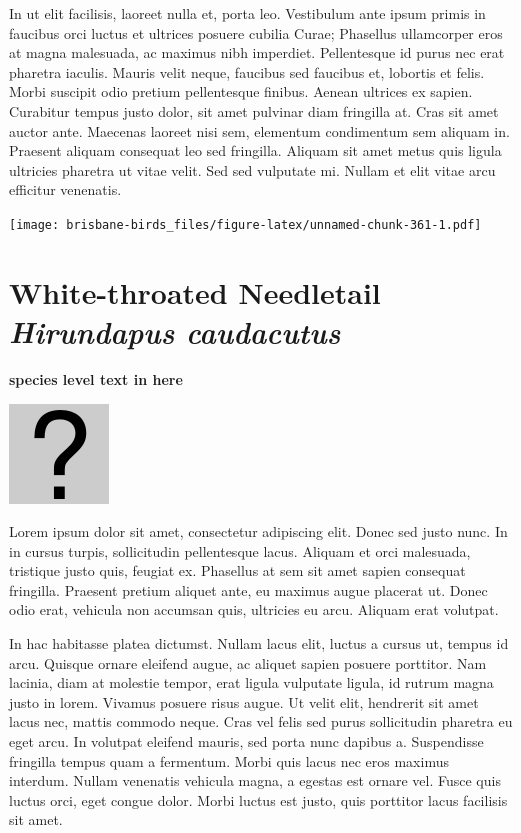 \documentclass[]{book}
\let\origfigure\figure
\let\endorigfigure\endfigure
\renewenvironment{figure}[1][2] {
  \expandafter\origfigure\expandafter[H]
} {
  \endorigfigure
}
\begin{document}
In ut elit facilisis, laoreet nulla et, porta leo. Vestibulum ante ipsum
primis in faucibus orci luctus et ultrices posuere cubilia Curae;
Phasellus ullamcorper eros at magna malesuada, ac maximus nibh
imperdiet. Pellentesque id purus nec erat pharetra iaculis. Mauris velit
neque, faucibus sed faucibus et, lobortis et felis. Morbi suscipit odio
pretium pellentesque finibus. Aenean ultrices ex sapien. Curabitur
tempus justo dolor, sit amet pulvinar diam fringilla at. Cras sit amet
auctor ante. Maecenas laoreet nisi sem, elementum condimentum sem
aliquam in. Praesent aliquam consequat leo sed fringilla. Aliquam sit
amet metus quis ligula ultricies pharetra ut vitae velit. Sed sed
vulputate mi. Nullam et elit vitae arcu efficitur venenatis.

\begin{figure}
\centering
\texttt{[image: brisbane-birds\_files/figure-latex/unnamed-chunk-361-1.pdf]}
\caption{\label{fig:unnamed-chunk-361}insert figure caption}
\end{figure}

\section{\texorpdfstring{White-throated Needletail \emph{Hirundapus
caudacutus}}{White-throated Needletail Hirundapus caudacutus}}\label{white-throated-needletail-hirundapus-caudacutus}

\textbf{species level text in here}

\begin{figure}
\centering
\includegraphics{assets/missing.png}
\caption{No image for species}
\end{figure}

Lorem ipsum dolor sit amet, consectetur adipiscing elit. Donec sed justo
nunc. In in cursus turpis, sollicitudin pellentesque lacus. Aliquam et
orci malesuada, tristique justo quis, feugiat ex. Phasellus at sem sit
amet sapien consequat fringilla. Praesent pretium aliquet ante, eu
maximus augue placerat ut. Donec odio erat, vehicula non accumsan quis,
ultricies eu arcu. Aliquam erat volutpat.

In hac habitasse platea dictumst. Nullam lacus elit, luctus a cursus ut,
tempus id arcu. Quisque ornare eleifend augue, ac aliquet sapien posuere
porttitor. Nam lacinia, diam at molestie tempor, erat ligula vulputate
ligula, id rutrum magna justo in lorem. Vivamus posuere risus augue. Ut
velit elit, hendrerit sit amet lacus nec, mattis commodo neque. Cras vel
felis sed purus sollicitudin pharetra eu eget arcu. In volutpat eleifend
mauris, sed porta nunc dapibus a. Suspendisse fringilla tempus quam a
fermentum. Morbi quis lacus nec eros maximus interdum. Nullam venenatis
vehicula magna, a egestas est ornare vel. Fusce quis luctus orci, eget
congue dolor. Morbi luctus est justo, quis porttitor lacus facilisis sit
amet.
\end{document}
